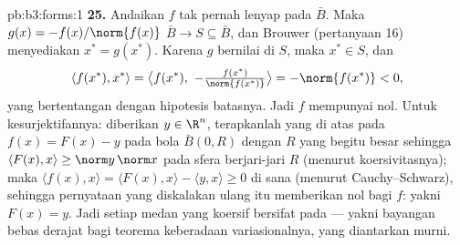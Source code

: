 \begin{solution}{pb:b3:forms:1}
\textbf{25.} Andaikan $f$ tak pernah lenyap pada $\bar B$. Maka
$g(x) = -f(x)/\norm{f(x)}$  $\bar B \to S
\subseteq \bar B$, dan Brouwer (pertanyaan 16) menyediakan $x^* =
g(x^*)$. Karena $g$ bernilai di $S$, maka $x^* \in S$, dan
\[
\langle f(x^*), x^*\rangle = \bigl\langle f(x^*),\
-\tfrac{f(x^*)}{\norm{f(x^*)}}\bigr\rangle
= -\norm{f(x^*)} < 0,
\]
yang bertentangan dengan hipotesis batasnya. Jadi $f$ mempunyai nol.
Untuk kesurjektifannya: diberikan $y \in \R^n$, terapkanlah yang di atas pada $f(x) =
F(x) - y$ pada bola $\bar B(0, R)$ dengan $R$ yang begitu besar sehingga
$\langle F(x), x\rangle \geq \norm y\,\norm x$ pada sfera
berjari-jari $R$ (menurut koersivitasnya); maka $\langle f(x), x\rangle =
\langle F(x), x\rangle - \langle y, x\rangle \geq 0$ di sana
(menurut Cauchy--Schwarz), sehingga pernyataan yang diskalakan ulang itu memberikan nol
bagi $f$: yakni $F(x) = y$. Jadi setiap medan  yang koersif bersifat pada
--- yakni bayangan bebas derajat bagi teorema keberadaan
variasionalnya, yang diantarkan  murni.

\end{solution}
